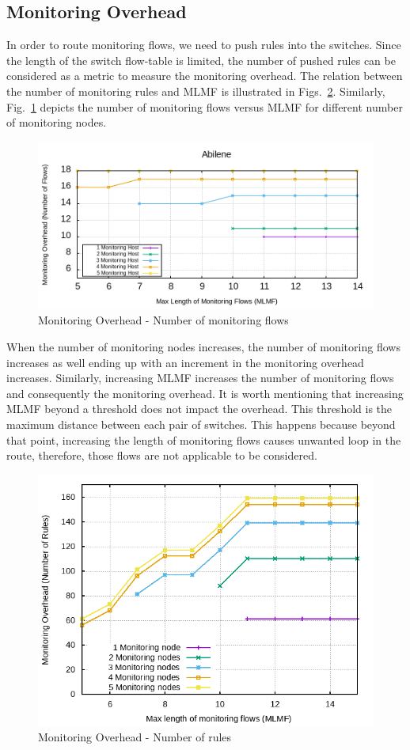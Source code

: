 \documentclass[10pt, journal, letterpaper]{IEEEtran}
\begin{document}
\subsection{Monitoring Overhead}\label{subsec:eval_monitoring_overhead}
In order to route monitoring flows, we need to push rules into the switches. Since the length of the switch flow-table is limited, the number of pushed rules can be considered as a metric to measure the monitoring overhead. The relation between the number of monitoring rules and MLMF is illustrated in Figs.~\ref{fig:required_rules}. Similarly, Fig.~\ref{fig:required_flows} depicts the number of monitoring flows versus MLMF for different number of monitoring nodes. 
\begin{figure}
    \centering
    \includegraphics[width=.8\columnwidth]{img/eval_Abilene_Max_Length_of_Routes_Number_of_Required_Flows.png}
    \caption{Monitoring Overhead - Number of monitoring flows}
    \label{fig:required_flows}
\end{figure}
When the number of monitoring nodes increases, the number of monitoring flows increases as well ending up with an increment in the monitoring overhead increases. Similarly, increasing MLMF increases the number of monitoring flows and consequently the monitoring overhead. It is worth mentioning that increasing MLMF beyond a threshold does not impact the overhead. This threshold is the maximum distance between each pair of switches. This happens because beyond that point, increasing the length of monitoring flows causes unwanted loop in the route, therefore, those flows are not applicable to be considered.
\begin{figure}
    \centering
    \includegraphics[width=.9\columnwidth]{img/eval_Abilene_Max_Length_of_Routes_Number_of_Required_Rules.png}
    \caption{Monitoring Overhead - Number of rules}
    \label{fig:required_rules}
\end{figure}
\end{document}
